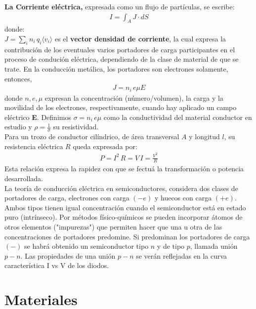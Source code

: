 \documentclass[]{article}
\begin{document}
  \textbf{La Corriente eléctrica,} expresada como un flujo de partículas, se escribe:
  \begin{align*}
    I = \int_{A} J\cdot  dS
  \end{align*}
  donde: \\
    $J = \sum_{i} n_i \, q_i \langle v_i\rangle$ es el \textbf{vector densidad de corriente}, la cual expresa
    la contribución de los eventuales varios portadores de carga participantes en el proceso de condución eléctrica,
    dependiendo de la clase de material de que se trate. En la conducción metálica, los portadores son electrones solamente, entonces,
    \begin{align*}
      J = n_i \, e\mu E
    \end{align*} 
  donde $n, e, \mu$ expresan la concentración (número/volumen), la carga y la movilidad de los electrones, respectivamente,
  cuando hay aplicado un campo eléctrico \textbf{E}. Definimos $\sigma = n_i \, e\mu$ como la conductividad del material conductor en estudio y 
  $\rho = \frac{1}{\sigma}$ su resistividad. \\

  Para un trozo de conductor cilíndrico, de área transversal $A$ y longitud $l$, su resistencia eléctrica $R$ queda expresada
  por: 
  \begin{align*}
    P = I^2 \, R = V \, I = \frac{V^2}{R}
  \end{align*} 
  Esta relación expresa la rapidez con que se fectuá la transformación o potencia desarrollada. \\
  
  La teoría de conducción eléctrica en semiconductores, considera dos clases de portadores de carga, electrones
  con carga $(-e)$ y huecos con carga $(+e)$. Ambos tipos tienen igual concentración cuando el semiconductor está en estado
  puro (intrínseco). Por métodos físico-químicos se pueden incorporar átomos de otros elementos ("impurezas") que permiten
  hacer que una u otra de las concentraciones de portadores predomine. Si predominan los portadores de carga $(-)$ se habrá 
  obtenido un semiconductor tipo $n$ y de tipo $p$, llamada unión $p - n$. Las propiedades de una unión $p-n$ se verán reflejadas en la curva característica
  I vs V de los diodos.





\section*{Materiales}
\end{document}
